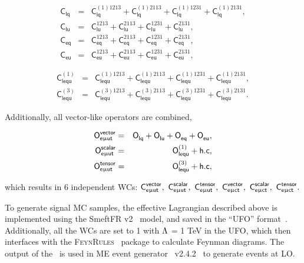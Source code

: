 \begin{eqnarray}
\label{eq:1:0}
 \textsf{C}_{\textsf{lq}}
 &=& \textsf{C}_{\textsf{lq}}^{(1)1213}
 + \textsf{C}_{\textsf{lq}}^{(1)2113}
 + \textsf{C}_{\textsf{lq}}^{(1)1231}
 + \textsf{C}_{\textsf{lq}}^{(1)2131}
 ,\\
\label{eq1:1}
 \textsf{C}_{\textsf{lu}}  
 &=& \textsf{C}_{\textsf{lu}}^{1213}
 + \textsf{C}_{\textsf{lu}}^{2113}
 + \textsf{C}_{\textsf{lu}}^{1231}
 + \textsf{C}_{\textsf{lu}}^{2131}
 ,\\
 \label{eq:1:2}
 \textsf{C}_{\textsf{eq}}
 &=& \textsf{C}_{\textsf{eq}}^{1213}
 + \textsf{C}_{\textsf{eq}}^{2113}
 + \textsf{C}_{\textsf{eq}}^{1231}
 + \textsf{C}_{\textsf{eq}}^{2131}
 ,\\
 \label{eq:1:3}
 \textsf{C}_{\textsf{eu}}  
 &=& \textsf{C}_{\textsf{eu}}^{1213}
 + \textsf{C}_{\textsf{eu}}^{2113}
 + \textsf{C}_{\textsf{eu}}^{1231}
 + \textsf{C}_{\textsf{eu}}^{2131},
\end{eqnarray}

\begin{eqnarray}
\label{eq:1:4}
 \textsf{C}_{\textsf{lequ}}^{(1)}  
 &=& \textsf{C}_{\textsf{lequ}}^{(1)1213}
 + \textsf{C}_{\textsf{lequ}}^{(1)2113}
 + \textsf{C}_{\textsf{lequ}}^{(1)1231}
 + \textsf{C}_{\textsf{lequ}}^{(1)2131}
 ,\\
\label{eq:1:5}
 \textsf{C}_{\textsf{lequ}}^{(3)}
 &=& \textsf{C}_{\textsf{lequ}}^{(3)1213}
 + \textsf{C}_{\textsf{lequ}}^{(3)2113}
 + \textsf{C}_{\textsf{lequ}}^{(3)1231}
 + \textsf{C}_{\textsf{lequ}}^{(3)2131}. 
\end{eqnarray}

Additionally, all vector-like operators are combined,

\begin{eqnarray}
\label{eq:1:6}
 \textsf{O}^{\textsf{vector}}_{\textsf{e}\upmu\textsf{{u}t}}&=&\textsf{O}^{}_{\textsf{lq}}+\textsf{O}^{}_{\textsf{lu}}+\textsf{O}^{}_{\textsf{eq}}+\textsf{O}^{}_{\textsf{eu}},\\
\label{eq:1:7}
 \textsf{O}^{\textsf{scalar}}_{\textsf{e}\upmu\textsf{{u}t}}&=&\textsf{O}^{(1)}_{\textsf{lequ}}+\textsf{h.c},\\
\label{eq:1:8}
 \textsf{O}^{\textsf{tensor}}_{\textsf{e}\upmu\textsf{{u}t}}&=&\textsf{O}^{(3)}_{\textsf{lequ}}+\textsf{h.c},
\end{eqnarray}

which results in 6 independent \acp{WC}: $\textsf{C}^{\textsf{vector}}_{\textsf{e}\upmu\textsf{{u}t}},~\textsf{C}^{\textsf{scalar}}_{\textsf{e}\upmu\textsf{{u}t}},~\textsf{C}^{\textsf{tensor}}_{\textsf{e}\upmu\textsf{{u}t}},~\textsf{C}^{\textsf{vector}}_{\textsf{e}\upmu\textsf{{c}t}},~\textsf{C}^{\textsf{scalar}}_{\textsf{e}\upmu\textsf{{c}t}},~\textsf{C}^{\textsf{tensor}}_{\textsf{e}\upmu\textsf{{c}t}}.$  

To generate signal \ac{MC} samples, the effective Lagrangian described above is implemented using the SmeftFR v2~\cite{Dedes:2019uzs} model, and saved in the ``UFO'' format~\cite{Degrande:2011ua}. Additionally, all the \acp{WC} are set to 1 with $\mathrm{\Lambda}$ = 1 TeV in the UFO, which then interfaces with the \textsc{FeynRules}~\cite{Christensen:2008py} package to calculate Feynman diagrams. The output of the \FR~is used in \ac{ME} event generator \MG~v2.4.2~\cite{Alwall:2014hca} to generate events at \ac{LO}. 

